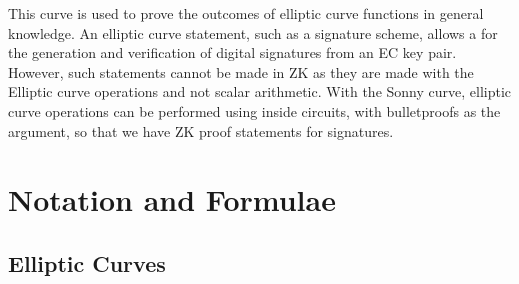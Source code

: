 \documentclass{article}
\theoremstyle{definition}
\theoremstyle{remark}
\begin{document}
	This curve is used to prove the outcomes of elliptic curve functions in general knowledge. An elliptic curve statement, such as a signature scheme, allows a for the generation and verification of digital signatures from an EC key pair. However, such statements cannot be made in ZK as they are made with the Elliptic curve operations and not scalar arithmetic. With the Sonny curve, elliptic curve operations can be performed using inside circuits, with bulletproofs as the argument, so that we have ZK proof statements for signatures. \\
	
	
	\section{Notation and Formulae} 
	
	\subsection{Elliptic Curves}
	
\end{document}
